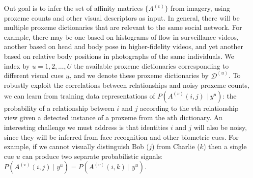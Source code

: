 Out goal is to infer the set of affinity matrices $\{A^{(v)}\}$ from imagery, using proxeme counts and other visual descriptors as input. In general, there will be multiple proxeme dictionaries that are relevant to the same social network. For example, there may be one based on histograms-of-flow in surveillance videos, another based on head and body pose in higher-fidelity videos, and yet another based on relative body positions in photographs of the same individuals. We index by $u=1,2,\ldots,U$ the available proxeme dictionaries corresponding to different visual cues $u$, and we denote these proxeme dictionaries by $\mathcal{D}^{(u)}$. To robustly exploit the correlations between relationships and noisy proxeme counts,
we can learn from training data representations of $P(A^{(v)}(i,j) \mid y^u)$: the probability of a relationship between $i$ and $j$ according to the $v$th relationship view given a detected instance of a proxeme from the $u$th dictionary. An interesting challenge we must address is that identities $i$ and $j$ will also be noisy, since they will be inferred from face recognition and other biometric cues. For example, if we cannot visually distinguish Bob ($j$) from Charlie ($k$) then a single cue $u$ can produce two separate probabilistic signals: $P(A^{(v)}(i,j) \mid y^u)=P(A^{(v)}(i,k) \mid y^u)$.


